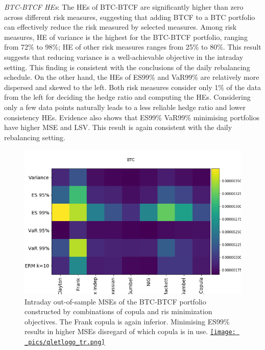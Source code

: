 \documentclass[11pt,a4paper,english]{article}
\begin{document}
\textit{BTC-BTCF HEs}: The HEs of BTC-BTCF are significantly higher than zero across different risk measures, suggesting that adding BTCF to a BTC portfolio can effectively reduce the risk measured by selected measures.
Among risk measures, HE of variance is the highest for the BTC-BTCF portfolio, ranging from 72\% to 98\%;
HE of other risk measures ranges from 25\% to 80\%.
This result suggests that reducing variance is a well-achievable objective in the intraday setting.
This finding is consistent with the conclusions of the daily rebalancing schedule. On the other hand, the HEs of ES99\% and VaR99\% are relatively more dispersed and skewed to the left.
Both risk measures consider only 1\% of the data from the left for deciding the hedge ratio and computing the HEs.
Considering only a few data points naturally leads to a less reliable hedge ratio and lower consistency HEs.
Evidence also shows that ES99\% VaR99\% minimising portfolios have higher MSE and LSV.
This result is again consistent with the daily rebalancing setting.

\begin{figure}[t]
\includegraphics[width=\textwidth]{_pics/revision_BTC_MSEs.png}
  \caption{Intraday out-of-sample MSEs of the BTC-BTCF portfolio constructed by combinations of copula and ris minimization objectives.
    The Frank copula is again inferior. Minimising ES99\% results in higher MSEs disregard of which copula is in use.
  \href{http://www.quantlet.com/}{\texttt{[image: \_pics/qletlogo\_tr.png]}} }
\label{fig:BTC_MSE}
\end{figure}
\end{document}

